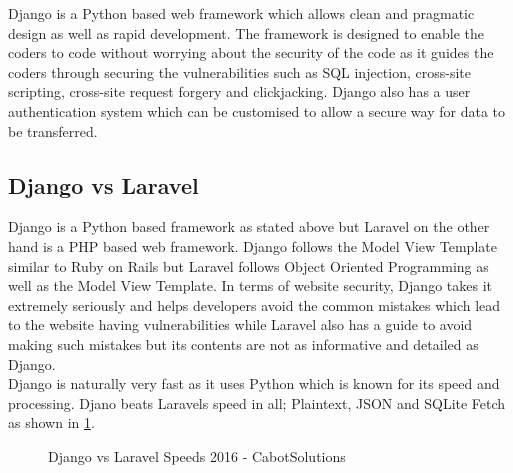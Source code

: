 \documentclass[../main.tex]{subfiles}
\begin{document}
\raggedright
Django is a Python based web framework which allows clean and pragmatic design as well as rapid development. The framework is designed to enable the coders to code without worrying about the security of the code as it guides the coders through securing the vulnerabilities such as SQL injection, cross-site scripting, cross-site request forgery and clickjacking. Django also has a user authentication system which can be customised to allow a secure way for data to be transferred\cite{django}. 

\subsection{Django vs Laravel}
Django is a Python based framework as stated above but Laravel\cite{laravel} on the other hand is a PHP based web framework. Django follows the Model View Template similar to Ruby on Rails but Laravel follows Object Oriented Programming as well as the Model View Template. In terms of website security, Django takes it extremely seriously and helps developers avoid the common mistakes which lead to the website having vulnerabilities while Laravel also has a guide to avoid making such mistakes but its contents are not as informative and detailed as Django. \\
Django is naturally very fast as it uses Python which is known for its speed and processing. Djano beats Laravels speed in all; Plaintext, JSON and SQLite Fetch\cite{djangovslaravel} as shown in \ref{fig:djangovslaravelsp}.

\begin{figure}[!htb]
        \caption{\label{fig:djangovslaravelsp} Django vs Laravel Speeds 2016 - CabotSolutions\cite{djangovslaravel}}
      \end{figure}
      
\end{document}

